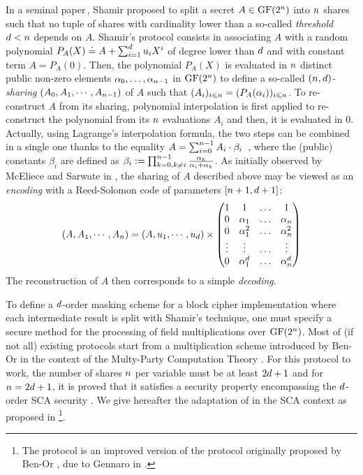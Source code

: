 \documentclass{llncs}
\begin{document}
In a seminal paper\,\cite{Sha79}, Shamir proposed to split a secret $A\in \GFn$ into $\nbShares$ shares such that
no tuple of shares with cardinality lower than a so-called {\em threshold} $\order<\nbShares$ depends on $A$. Shamir's
protocol consists in associating $A$ with a random polynomial $P_A(X)\doteq A + \sum_{i=1}^{\order}\polyCoef X^i$ of degree lower than $\order$ and with constant term $A=P_A(0)$. Then, the polynomial $P_A(X)$ is evaluated in $\nbShares$ distinct public non-zero elements $\pubElt[0], \ldots, \pubElt[n-1]$ in $\GFn$ to define a so-called {\em $(\nbShares,\order)$-sharing} $(A_0,A_1,\cdots,A_{\nbShares-1})$ of $A$ such that $(A_i)_{i\leqslant \nbShares}=(P_A(\alpha_i))_{i\leqslant \nbShares}$. To re-construct $A$ from its sharing, polynomial interpolation is first applied to re-construct the polynomial from its $\nbShares$ evaluations $A_i$ and then, it is evaluated in $0$. Actually, using Lagrange's
interpolation formula, the two steps can be combined in a single one thanks to the equality $ A=\sum_{i=0}^{\nbShares-1} A_i \cdot \beta_i\enspace$,  where the (public) constants $\beta_i$ are defined as $\beta_i:=\prod_{k=0,k\neq i}^{\nbShares-1} \frac{\alpha_k}{\alpha_i+\alpha_k}$. As initially observed by McEliece and Sarwate in \cite{MS81}, the sharing of $A$ described above may be viewed as an {\em encoding} with a Reed-Solomon code of parameters $[\nbShares + 1,\order + 1]$:
$$
(A,A_1,\cdots,A_{\nbShares}) = (A,\polyCoef[1],\cdots,\polyCoef[\order])\times 
\left(\begin{matrix}
1 & 1 & \hdots & 1 \\
0 & \pubElt[1] & \hdots & \pubElt[\nbShares] \\
0 & \pubElt[1]^2 & \hdots & \pubElt[\nbShares]^2 \\
\vdots & \vdots & \hdots & \vdots \\
0 & \pubElt[1]^{\order} & \hdots & \pubElt[\nbShares]^{\order} 
\end{matrix}
\right)
$$
The reconstruction of $A$ then corresponds to a simple {\em decoding}.
\vspace{3mm}

To define a $\order$\myth-order masking scheme for a block cipher
implementation where each intermediate result is split with Shamir's
technique, one must specify a secure method for the processing of field
multiplications over $\GFn$. Most of (if not all) existing protocols start from a multiplication scheme introduced by
Ben-Or \etal in the context of the Multy-Party Computation Theory
\cite{BGW88}. For this protocol to work, the number of shares $\nbShares$ per variable must be at least $2\order+1$ and for $\nbShares=2\order+1$, it is proved that it satisfies a security property encompassing the $\order$\myth-order SCA security \cite{PR11}. We give hereafter the adaptation of
\cite{BGW88} in the 
SCA context as proposed in \cite{PR11,RP12}\footnote{The protocol is 
an improved version of the protocol originally proposed by Ben-Or \etal \cite{BGW88},
due to Gennaro \etal in \cite{GRR98}.}.
\end{document}
